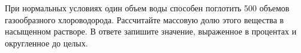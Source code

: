 
При нормальных условиях
один объем воды способен поглотить 500 объемов газообразного хлороводорода.
Рассчитайте массовую долю этого вещества в насыщенном растворе. В ответе
запишите значение, выраженное в процентах и округленное до целых.



